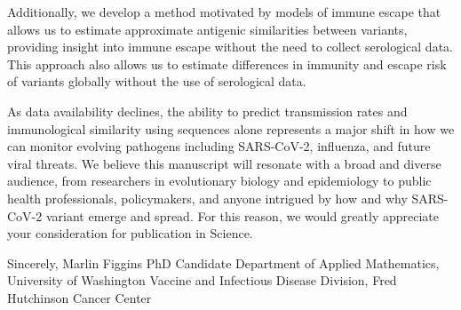 \documentclass[11pt]{article}
\begin{document}
Additionally, we develop a method motivated by models of immune escape that allows us to estimate approximate antigenic similarities between variants, providing insight into immune escape without the need to collect serological data.
This approach also allows us to estimate differences in immunity and escape risk of variants globally without the use of serological data.

As data availability declines, the ability to predict transmission rates and immunological similarity using sequences alone represents a major shift in how we can monitor evolving pathogens including SARS-CoV-2, influenza, and future viral threats.
We believe this manuscript will resonate with a broad and diverse audience, from researchers in evolutionary biology and epidemiology to public health professionals, policymakers, and anyone intrigued by how and why SARS-CoV-2 variant emerge and spread.
For this reason, we would greatly appreciate your consideration for publication in Science.

\vspace{0.3in} %

Sincerely, \newline
\vspace{0.05in} \newline
Marlin Figgins \newline
PhD Candidate \newline
Department of Applied Mathematics, University of Washington \newline
Vaccine and Infectious Disease Division, Fred Hutchinson Cancer Center
\end{document}
